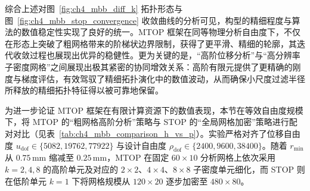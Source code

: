 综合上述对图~\ref{fig:ch4_mbb_diff_k} 拓扑形态与图~\ref{fig:ch4_mbb_stop_convergence} 收敛曲线的分析可见，构型的精细程度与算法的数值稳定性实现了良好的统一。MTOP 框架在同等物理分析自由度下，不仅在形态上突破了粗网格带来的阶梯状边界限制，获得了更平滑、精细的轮廓，其迭代收敛过程也展现出优异的稳健性。更为关键的是，“高阶位移分析”与“高分辨率子密度网格”之间展现出极其紧密的协同增效关系：高阶有限元提供了更精确的刚度与梯度评估，有效驾驭了精细拓扑演化中的数值波动，从而确保小尺度过滤半径所释放的精细拓扑特征得以被可靠地保留。

为进一步论证 MTOP 框架在有限计算资源下的数值表现，本节在等效自由度规模下，将 MTOP 的“粗网格高阶分析”策略与 STOP 的“全局网格加密”策略进行配对对比（见表~\ref{tab:ch4_mbb_comparison_h_vs_p}）。实验严格对齐了位移自由度 $u_{\mathrm{dof}} \in \{5082, 19762, 77922\}$ 与设计自由度 $\rho_{\mathrm{dof}} \in \{2400, 9600, 38400\}$。随着 $r_{\min}$ 从 $0.75\,\mathrm{mm}$ 缩减至 $0.25\,\mathrm{mm}$，MTOP 在固定 $60\times10$ 分析网格上依次采用 $k=2,4,8$ 的高阶单元及对应的 $2\times2$、$4\times4$、$8\times8$ 子密度单元细化，而 STOP 则在低阶单元 $k=1$ 下将网格规模从 $120\times20$ 逐步加密至 $480\times80$。
